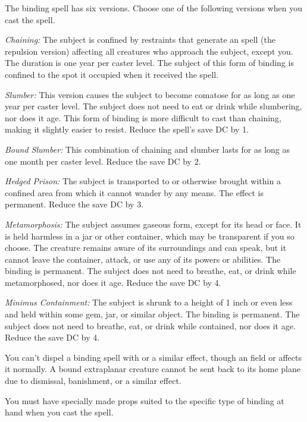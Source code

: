 The binding spell has six versions. Choose one of the following versions when you cast the spell.
\begin{list}{}{\leftmargin=1em}
 \item \emph{Chaining:}
The subject is confined by restraints that generate an  spell (the repulsion version) affecting all creatures who approach the subject, except you. 
The duration is one year per caster level. 
The subject of this form of binding is confined to the spot it occupied when it received the spell.
\item \emph{Slumber:}
This version causes the subject to become comatose for as long as one year per caster level. 
The subject does not need to eat or drink while slumbering, nor does it age. 
This form of binding is more difficult to cast than chaining, making it slightly easier to resist. Reduce the spell's save DC by 1.
 \item \emph{Bound Slumber:}
This combination of chaining and slumber lasts for as long as one month per caster level. Reduce the save DC by 2.
 \item \emph{Hedged Prison:}
The subject is transported to or otherwise brought within a confined area from which it cannot wander by any means. 
The effect is permanent. Reduce the save DC by 3.
 \item \emph{Metamorphosis:}
The subject assumes gaseous form, except for its head or face. 
It is held harmless in a jar or other container, which may be transparent if you so choose. 
The creature remains aware of its surroundings and can speak, but it cannot leave the container, attack, or use any of its powers or abilities. 
The binding is permanent. 
The subject does not need to breathe, eat, or drink while metamorphosed, nor does it age. Reduce the save DC by 4.
 \item \emph{Minimus Containment:}
The subject is shrunk to a height of 1 inch or even less and held within some gem, jar, or similar object. 
The binding is permanent. The subject does not need to breathe, eat, or drink while contained, nor does it age. Reduce the save DC by 4.
\end{list}
You can't dispel a binding spell with  or a similar effect, 
though an  field or  affects it normally. 
A bound extraplanar creature cannot be sent back to its home plane due to dismissal, banishment, or a similar effect.

You must have specially made props suited to the specific type of binding at hand when you cast the spell.

